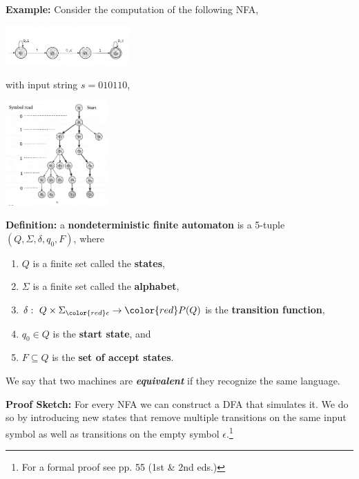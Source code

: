 \documentclass[a4paper,blends,pdf,colorBG,slideColor]{prosper}
\begin{document}
{\bf Example:} Consider the computation of the following NFA,
\begin{center}
\includegraphics[height=15mm]{images/nfa2.eps}
\end{center}
with input string $s=010110$,
\begin{center}
\includegraphics[height=40mm]{images/nfa2-comp.eps}
\end{center}

\es


{\bf Definition:} a {\bf {\color{red} nondeterministic} finite automaton} is a 5-tuple $(Q, \Sigma, \delta, q_0, F)$, where
\begin{enumerate}
\item $Q$ is a finite set called the {\bf states},
\item $\Sigma$ is a finite set called the {\bf alphabet},
\item $\delta\co Q \times \Sigma_{\color{red}\epsilon} \rightarrow {\color{red}P(Q)}$ is the {\bf transition function},
\item $q_0 \in Q$ is the {\bf start state}, and
\item $F \subseteq Q$ is the {\bf set of accept states}.
\end{enumerate}

\es

We say that two machines are {\bf\em equivalent} if they recognize the same language.

\begin{center}
\end{center}

{\bf Proof Sketch:} For every NFA we can construct a DFA that simulates it.  We do
so by introducing new states that remove multiple transitions on the same input symbol 
as well as transitions on the empty symbol $\epsilon$.\vspace{1.5in}\footnote{For a formal proof see 
pp. 55 (1st \& 2nd eds.)}
\end{document}
